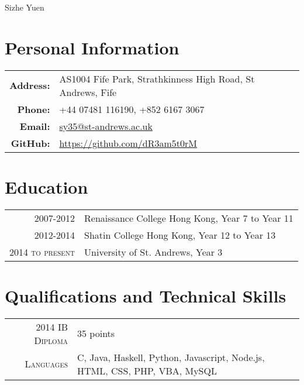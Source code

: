 \documentclass{article}
\begin{document}
\pagestyle{empty} %


\par{\centering
		{\Huge Sizhe Yuen
	}\bigskip\par}

\section*{Personal Information}

\begin{tabular}{rl}
    \textbf{Address:}   & AS1004 Fife Park, Strathkinness High Road, St Andrews, Fife \\
    \textbf{Phone:}     & +44 07481 116190, +852 6167 3067 \\
    \textbf{Email:}     & \textcolor{blue}{\href{mailto:sy35@st-andrews.ac.uk}{sy35@st-andrews.ac.uk}} \\
    \textbf{GitHub:}    & \textcolor{blue}{\href{https://github.com/dR3am5t0rM}{https://github.com/dR3am5t0rM}}
\end{tabular}

\section*{Education}
\begin{tabular}{r|p{14cm}}

\textsc{2007-2012} & Renaissance College Hong Kong, Year 7 to Year 11\\

\textsc{2012-2014} & Shatin College Hong Kong, Year 12 to Year 13\\

\textsc{2014 to present} & University of St. Andrews, Year 3\\

\end{tabular}
\section*{Qualifications and Technical Skills}
\begin{tabular}{r|p{14cm}}
\textsc{2014 IB Diploma} &  35 points\\
\textsc{Languages} & C, Java, Haskell, Python, Javascript, Node.js, HTML, CSS, PHP, VBA, MySQL\\
\end{tabular}
\end{document}
